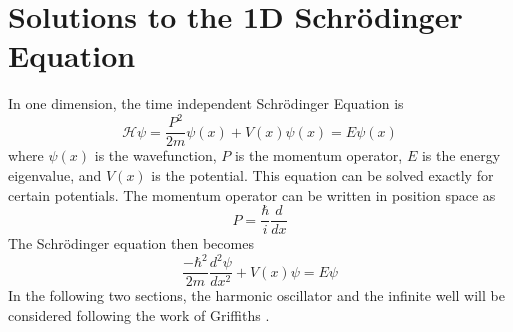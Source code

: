 \chapter{Solutions to the 1D Schr\"odinger Equation}
In one dimension, the time independent Schr\"odinger Equation is
\begin{equation}
    \mathcal{H}\psi=\frac{P^2}{2m}\psi(x)+V(x)\psi(x)=E\psi(x)
\end{equation}
where $\psi(x)$ is the wavefunction, $P$ is the momentum operator, $E$ is the energy eigenvalue, and $V(x)$ is the potential. This equation can be solved exactly for certain potentials. The momentum operator can be written in position space as 
\begin{equation}
P=\frac{\hbar}{i}\frac{d}{dx}    
\end{equation}
The Schr\"odinger equation then becomes
\begin{equation}
    \frac{-\hbar^2}{2m}\frac{d^2 \psi}{dx^2} + V(x) \psi=E\psi
\end{equation}
In the following two sections, the harmonic oscillator and the infinite well will be considered following the work of Griffiths \cite{Griffiths}.

